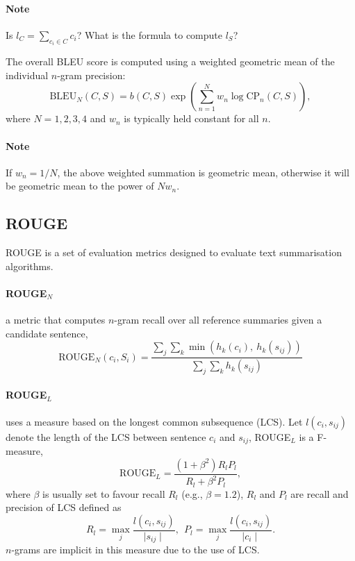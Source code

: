 {\it
\paragraph{Note}
Is $l_C = \sum_{c_i \in C} c_i$?
What is the formula to compute $l_S$? \\
}

\noindent 
The overall BLEU score is computed using a weighted geometric mean of the individual $n$-gram precision:
\begin{equation*}
\text{BLEU}_N(C, S) = b(C, S) \exp\left( \sum_{n=1}^N w_n \log \text{CP}_n(C, S) \right),
\end{equation*}
where $N=1,2,3,4$ and $w_n$ is typically held constant for all $n$.

{\it
\paragraph{Note}
If $w_n = 1/N$, the above weighted summation is geometric mean, otherwise it will be geometric mean to the power of $N w_n$.
}


\subsection{ROUGE}
ROUGE is a set of evaluation metrics designed to evaluate text summarisation algorithms.

\paragraph{ROUGE$_N$} a metric that computes $n$-gram recall over all reference summaries given a candidate sentence,
\begin{equation*}
\text{ROUGE}_N (c_i, S_i) = \frac{\sum_j \sum_k \min\left( h_k(c_i),~ h_k(s_{ij}) \right)} {\sum_j \sum_k h_k(s_{ij})}
\end{equation*}

\paragraph{ROUGE$_L$} uses a measure based on the longest common subsequence (LCS).
Let $l(c_i, s_{ij})$ denote the length of the LCS between sentence $c_i$ and $s_{ij}$,
ROUGE$_L$ is a F-measure,
\begin{equation*}
\text{ROUGE}_L = \frac{(1 + \beta^2) R_l P_l} {R_l + \beta^2 P_l},
\end{equation*}
where $\beta$ is usually set to favour recall $R_l$ (e.g., $\beta=1.2$),
$R_l$ and $P_l$ are recall and precision of LCS defined as
\begin{equation*}
R_l = \max_j \frac{l(c_i, s_{ij})} {\mid s_{ij} \mid}, ~~
P_l = \max_j \frac{l(c_i, s_{ij})} {\mid c_i \mid}.
\end{equation*}
$n$-grams are implicit in this measure due to the use of LCS.

